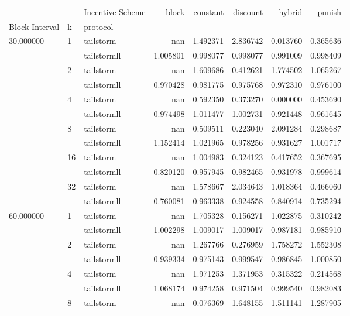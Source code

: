 \begin{tabular}{lllrrrrr}
 &  & Incentive Scheme & block & constant & discount & hybrid & punish \\
Block Interval & k & protocol &  &  &  &  &  \\
\multirow[c]{12}{*}{30.000000} & \multirow[c]{2}{*}{1} & tailstorm & nan & 1.492371 & 2.836742 & 0.013760 & 0.365636 \\
 &  & tailstormll & 1.005801 & 0.998077 & 0.998077 & 0.991009 & 0.998409 \\
 & \multirow[c]{2}{*}{2} & tailstorm & nan & 1.609686 & 0.412621 & 1.774502 & 1.065267 \\
 &  & tailstormll & 0.970428 & 0.981775 & 0.975768 & 0.972310 & 0.976100 \\
 & \multirow[c]{2}{*}{4} & tailstorm & nan & 0.592350 & 0.373270 & 0.000000 & 0.453690 \\
 &  & tailstormll & 0.974498 & 1.011477 & 1.002731 & 0.921448 & 0.961645 \\
 & \multirow[c]{2}{*}{8} & tailstorm & nan & 0.509511 & 0.223040 & 2.091284 & 0.298687 \\
 &  & tailstormll & 1.152414 & 1.021965 & 0.978256 & 0.931627 & 1.001717 \\
 & \multirow[c]{2}{*}{16} & tailstorm & nan & 1.004983 & 0.324123 & 0.417652 & 0.367695 \\
 &  & tailstormll & 0.820120 & 0.957945 & 0.982465 & 0.931978 & 0.999614 \\
 & \multirow[c]{2}{*}{32} & tailstorm & nan & 1.578667 & 2.034643 & 1.018364 & 0.466060 \\
 &  & tailstormll & 0.760081 & 0.963338 & 0.924558 & 0.840914 & 0.735294 \\
\multirow[c]{12}{*}{60.000000} & \multirow[c]{2}{*}{1} & tailstorm & nan & 1.705328 & 0.156271 & 1.022875 & 0.310242 \\
 &  & tailstormll & 1.002298 & 1.009017 & 1.009017 & 0.987181 & 0.985910 \\
 & \multirow[c]{2}{*}{2} & tailstorm & nan & 1.267766 & 0.276959 & 1.758272 & 1.552308 \\
 &  & tailstormll & 0.939334 & 0.975143 & 0.999547 & 0.986845 & 1.000850 \\
 & \multirow[c]{2}{*}{4} & tailstorm & nan & 1.971253 & 1.371953 & 0.315322 & 0.214568 \\
 &  & tailstormll & 1.068174 & 0.974258 & 0.971504 & 0.999540 & 0.982083 \\
 & \multirow[c]{2}{*}{8} & tailstorm & nan & 0.076369 & 1.648155 & 1.511141 & 1.287905 \\

\end{tabular}
